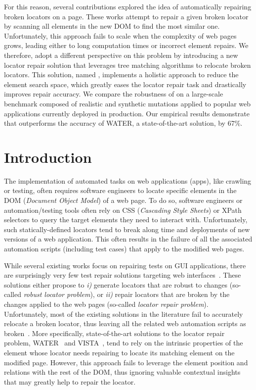 For this reason, several contributions explored the idea of automatically repairing broken locators on a page. 
These works attempt to repair a given broken locator by scanning all elements in the new DOM to find the most similar one.
Unfortunately, this approach fails to scale when the complexity of web pages grows, leading either to long computation times or incorrect element repairs.
% 
We therefore, adopt a different perspective on this problem by introducing a new locator repair solution that leverages tree matching algorithms to relocate broken locators.
This solution, named \erratum{}, implements a holistic approach to reduce the element search space, which greatly eases the locator repair task and drastically improves repair accuracy.
% 
We compare the robustness of \erratum{} on a large-scale benchmark composed of realistic and synthetic mutations applied to popular web applications currently deployed in production.
Our empirical results demonstrate that \erratum{} outperforms the accuracy of WATER, a state-of-the-art solution, by 67\%.

\section{Introduction}
The implementation of automated tasks on web applications (apps), like crawling or testing, often requires software engineers to locate specific elements in the DOM (\emph{Document Object Model}) of a web page.
To do so, software engineers or automation/testing tools often rely on CSS (\emph{Cascading Style Sheets}) or XPath selectors to query the target elements they need to interact with.
Unfortunately, such statically-defined locators tend to break along time and deployments of new versions of a web application.
This often results in the failure of all the associated automation scripts (including test cases) that apply to the modified web pages.

While several existing works focus on repairing tests on GUI applications, there are surprisingly very few test repair solutions targeting web interfaces~\cite{imtiaz2019systematic}.
These solutions either propose to \emph{i)} generate locators that are robust to changes (so-called \emph{robust locator problem}), or \emph{ii)} repair locators that are broken by the changes applied to the web pages (so-called \emph{locator repair problem}).
Unfortunately, most of the existing solutions in the literature fail to accurately relocate a broken locator, thus leaving all the related web automation scripts as broken~\cite{hammoudi2016record}.
% 
More specifically, state-of-the-art solutions to the locator repair problem, WATER~\cite{choudhary2011water} and VISTA~\cite{stocco2018visual}, tend to rely on the intrinsic properties of the element whose locator needs repairing to locate its matching element on the modified page. 
However, this approach fails to leverage the element position and relations with the rest of the DOM, thus ignoring valuable contextual insights that may greatly help to repair the locator.

